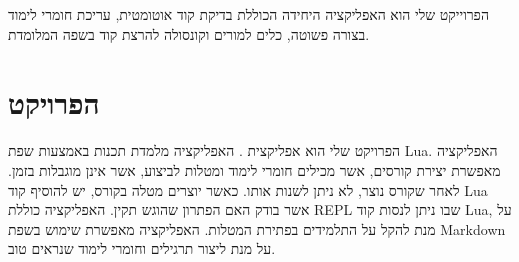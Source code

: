 הפרוייקט שלי הוא האפליקציה היחידה הכוללת בדיקת קוד אוטומטית,
עריכת חומרי לימוד בצורה פשוטה, כלים למורים וקונסולה להרצת קוד בשפה המלומדת.

\section{הפרויקט}

הפרויקט שלי הוא אפליקצית \projectname.
האפליקציה מלמדת תכנות באמצעות שפת Lua.
האפליקציה מאפשרת יצירת קורסים, אשר מכילים חומרי לימוד ומטלות לביצוע, אשר אינן מוגבלות בזמן.
לאחר שקורס נוצר, לא ניתן לשנות אותו.
כאשר יוצרים מטלה בקורס, יש להוסיף קוד Lua אשר בודק האם הפתרון שהוגש תקין.
האפליקציה כוללת REPL שבו ניתן לנסות קוד Lua, על מנת להקל על התלמידים בפתירת המטלות.
האפליקציה מאפשרת שימוש בשפת Markdown על מנת ליצור תרגילים וחומרי לימוד שנראים טוב.